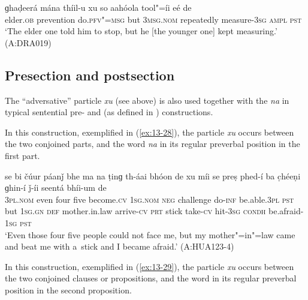 \begin{exe}
\ex
\label{ex:13-27}
\gll ɡhaḍeerá mána thíil-u xu so aahóola tool"=íi eé de \\
elder.\textsc{ob} prevention do.\textsc{pfv"=msg} but \textsc{3msg.nom} repeatedly measure-\textsc{3sg} \textsc{ampl}{\protect\footnotemark} \textsc{pst} \\
\glt `The elder one told him to stop, but he [the younger one] kept measuring.' (A:DRA019)
\end{exe}


\subsection{Presection and postsection}
\label{subsec:13-2-2}

The ``adversative'' particle \textit{xu} (see above) is also used together with the  \textit{na} in typical sentential pre- and  (as defined in ) constructions.


 In this construction, exemplified in (\ref{ex:13-28}), the particle \textit{xu} occurs between the two conjoined parts, and the  word \textit{na} in its regular preverbal position in the first part.

\begin{exe}
\ex
\label{ex:13-28}
\gll se bi čúur páanǰ bhe ma na ṭinɡ th-áai bhóon de xu míi se preṣ phed-í ba c̣héeṇi ɡhin-í ǰ-íi seentá bhíi-um de \\
\textsc{3pl.nom} even four five become.\textsc{cv} \textsc{1sg.nom} \textsc{neg}  challenge do-\textsc{inf} be.able.\textsc{3pl} \textsc{pst} but \textsc{1sg.gn}  \textsc{def} mother.in.law arrive-\textsc{cv} \textsc{prt} stick take-\textsc{cv} hit-\textsc{3sg} \textsc{condh} be.afraid-\textsc{1sg} \textsc{pst} \\
\glt `Even those four five people could not face me, but my mother"=in"=law came and beat me with a~stick and I became afraid.' (A:HUA123-4) 
\end{exe}

 In this construction, exemplified in (\ref{ex:13-29}), the particle \textit{xu} occurs between the two conjoined clauses or propositions, and the  word in its regular preverbal position in the second proposition.

